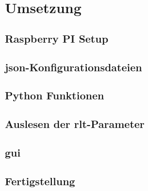 \chapter{Umsetzung}

\section{Raspberry PI Setup}
\setAuthor{\pezze}


\setAuthor{\mangeng}


\section{\acs{json}-Konfigurationsdateien}
\setAuthor{\pezze}


\setAuthor{\schneider}


\section{Python Funktionen}
\setAuthor{\pezze}


\section{Auslesen der \acs{rlt}-Parameter}
\setAuthor{\schneider}



\section{\acf{gui}}
\setAuthor{\pezze}



\section{Fertigstellung}
\setAuthor{\schneider}


\setAuthor{\pezze}


